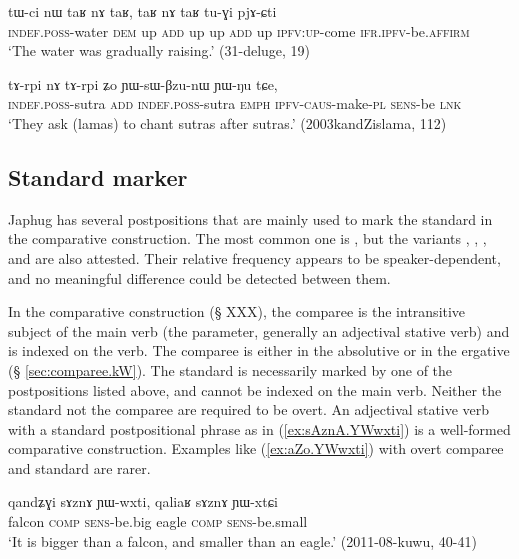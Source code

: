 \begin{exe}
\ex  \label{ex:taR.nA.taR}
\gll tɯ-ci nɯ taʁ nɤ taʁ, taʁ nɤ taʁ tu-ɣi pjɤ-ɕti \\
\textsc{indef}.\textsc{poss}-water  \textsc{dem} up \textsc{add}  up up \textsc{add} up \textsc{ipfv}:\textsc{up}-come \textsc{ifr}.\textsc{ipfv}-be.\textsc{affirm} \\
\glt `The water was gradually raising.' (31-deluge, 19)
\end{exe} 

\begin{exe}
\ex  \label{ex:tArpi.nA.tArpi}
\gll tɤ-rpi nɤ tɤ-rpi ʑo ɲɯ-sɯ-βzu-nɯ ɲɯ-ŋu tɕe, \\
\textsc{indef}.\textsc{poss}-sutra \textsc{add} \textsc{indef}.\textsc{poss}-sutra \textsc{emph} \textsc{ipfv}-\textsc{caus}-make-\textsc{pl} \textsc{sens}-be \textsc{lnk} \\
\glt `They ask (lamas) to chant sutras after sutras.' (2003kandZislama, 112)
\end{exe} 
 

\subsection{Standard marker} \label{sec:comparative} 
Japhug has several postpositions that are mainly used to mark the standard in the comparative construction. The most common one is , but the variants , , ,  and  are also attested. Their relative frequency appears to be speaker-dependent, and no meaningful difference could be detected between them. 

In the comparative construction (§ XXX), the comparee is the intransitive subject of the main verb (the parameter, generally an adjectival stative verb) and is indexed on the verb. The comparee is either in the absolutive or in the ergative (§ \ref{sec:comparee.kW}). The standard is necessarily marked by one of the postpositions listed above, and cannot be indexed on the main verb. Neither the standard not the comparee are required to be overt. An adjectival stative verb with a standard postpositional phrase as in  (\ref{ex:sAznA.YWwxti})  is a well-formed comparative construction. Examples like (\ref{ex:aZo.YWwxti}) with overt comparee and standard are rarer.

\begin{exe}
\ex \label{ex:sAznA.YWwxti}
\gll  qandʑɣi sɤznɤ ɲɯ-wxti, qaliaʁ sɤznɤ ɲɯ-xtɕi \\
falcon \textsc{comp} \textsc{sens}-be.big eagle \textsc{comp} \textsc{sens}-be.small \\
\glt `It is bigger than a falcon, and smaller than an eagle.' (2011-08-kuwu, 40-41)
\end{exe}

